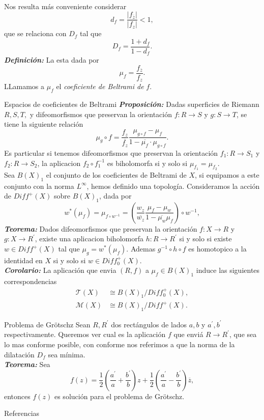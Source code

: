 \documentclass[final]{beamer}
\newlength{\colwidth}
\newcommand{\defi}[1]{\textbf{\emph{#1}}}
\begin{document}
\begin{frame}[t,fragile]
\begin{columns}[t]
\begin{column}{\colwidth}
\phantom{xd}\\ \vspace{0.85cm}
Nos resulta más conveniente considerar 
     $$d_f=\frac{|f_{\overline{z}}|}{|f_z|}<1,$$
    que se relaciona con $D_f$ tal que
    $$D_f=\frac{1+d_f}{1-d_f}.$$
\defi{Definición: } La  esta dada por
        $$\mu_f=\frac{f_{\overline{z}}}{f_z}.$$
        LLamamos a $\mu_f$ el \textit{coeficiente de Beltrami de }$f.$
\begin{exampleblock}{Espacios de coeficientes de Beltrami}
\defi{Proposición: }Dadas superficies de Riemann $R,S,T,$ y difeomorfismos que preservan la orientación $f:R\to S$ y $g:S\to T$, se tiene la siguiente relación
        $$\mu_g\circ f=\frac{f_z}{\overline{f_z}}\frac{\mu_{g\circ f}-\mu_f}{1-\overline{\mu_f}\cdot\mu_{g\circ f}}.$$ 
        Es particular si tenemos difeomorfismos que preservan la orientación $f_1:R\to S_1$ y $f_2:R\to S_2$, la aplicacion $f_2\circ f_1^{-1}$ es biholomorfa si y solo si $\mu_{f_1}=\mu_{f_2}.$\\
    Sea $B(X)_1$ el conjunto de los coeficientes de Beltrami de $X$, si equipamos a este conjunto con la norma $L^\infty$, hemos definido una topología. Consideramos la acción de $Diff^+(X)$ sobre $B(X)_1$, dada por
    $$w^*(\mu_f)=\mu_{f\circ w^{-1}}=\left(\frac{w_z}{\overline{w_z}}\frac{\mu_f-\mu_w}{1-\overline{\mu_w}\mu_f}\right)\circ w^{-1},$$
    \defi{Teorema: }Dados difeomorfismos que preservan la orientación $f:X\to R$ y $g:X\to R^\prime$, existe una aplicacion biholomorfa $h:R\to R^\prime$ si y solo si existe $w\in Diff^+(X)$ tal que $\mu_g=w^*(\mu_f).$ Ademas $g^{-1}\circ h\circ f$ es homotopico a la identidad en $X$ si y solo si $w\in Diff_0^+(X).$\\ 
    \defi{Corolario: }La aplicación que envia $(R,f)$ a $\mu_f\in B(X)_1$ induce las siguientes correspondencias
        \begin{align*}
           \mathcal{T}(X)&\cong B(X)_1/Diff_0^+(X),\\
           \mathcal{M}(X)&\cong B(X)_1/Diff^+(X). 
        \end{align*}
\end{exampleblock}
\begin{alertblock}{Problema de Grötschz}
    Sean $R,R^\prime$ dos rectángulos de lados $a,b$ y $a^\prime,b^\prime$ respectivamente. Queremos ver cual es la aplicación $f$ que enviá $R\to R^\prime$, que sea lo mas conforme posible, con conforme nos referimos a que la norma de la dilatación $D_f$ sea mínima.\\
    \defi{Teorema: }        Sea 
        $$f(z)=\frac{1}{2}\left(\frac{a^\prime}{a}+\frac{b^\prime}{b}\right)z+\frac{1}{2}\left(\frac{a^\prime}{a}-\frac{b^\prime}{b}\right)\overline{z},$$
        entonces $f(z)$ es solución para el problema de Grötschz.\\ 
\end{alertblock}
\begin{block}{Referencias}
        \begin{thebibliography}{9}


\end{thebibliography}
\end{block}
\end{column}
\end{columns}
\end{frame}
\end{document}
